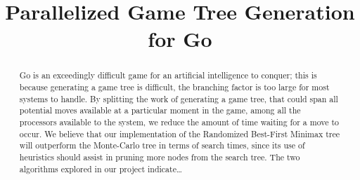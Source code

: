 \documentclass[conference]{IEEEtran}
\begin{document}
\title{Parallelized Game Tree Generation\\for Go}


\author{
}

\maketitle


\begin{abstract}
Go is an exceedingly difficult game for an artificial intelligence to conquer; this is because generating a game tree is difficult, the branching factor is too large for most systems to handle. By splitting the work of generating a game tree, that could span all potential moves available at a particular moment in the game, among all the processors available to the system, we reduce the amount of time waiting for a move to occur. We believe that our implementation of the Randomized Best-First Minimax tree will outperform the Monte-Carlo tree in terms of search times, since its use of heuristics should assist in pruning more nodes from the search tree. The two algorithms explored in our project indicate\dots

\end{abstract}
\end{document}
